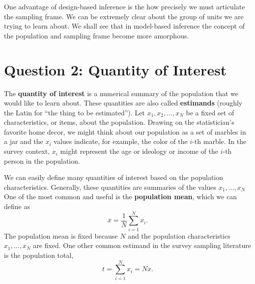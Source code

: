 \documentclass[
  letterpaper,
  DIV=11,
  numbers=noendperiod]{scrreprt}
\theoremstyle{definition}
\theoremstyle{definition}
\theoremstyle{plain}
\theoremstyle{remark}
\begin{document}
One advantage of design-based inference is the how precisely we must
articulate the sampling frame. We can be extremely clear about the group
of units we are trying to learn about. We shall see that in model-based
inference the concept of the population and sampling frame become more
amorphous.

\hypertarget{question-2-quantity-of-interest}{%
\section{Question 2: Quantity of
Interest}\label{question-2-quantity-of-interest}}

The \textbf{quantity of interest} is a numerical summary of the
population that we would like to learn about. These quantities are also
called \textbf{estimands} (roughly the Latin for ``the thing to be
estimated''). Let \(x_1, x_2, \ldots, x_N\) be a fixed set of
characteristics, or items, about the population. Drawing on the
statistician's favorite home decor, we might think about our population
as a set of marbles in a jar and the \(x_i\) values indicate, for
example, the color of the \(i\)-th marble. In the survey context,
\(x_i\) might represent the age or ideology or income of the \(i\)-th
person in the population.

We can easily define many quantities of interest based on the population
characteristics. Generally, these quantities are summaries of the values
\(x_1, \ldots, x_N\) One of the most common and useful is the
\textbf{population mean}, which we can define as \[
\overline{x} = \frac{1}{N} \sum_{i=1}^N x_i.
\] The population mean is fixed because \(N\) and the population
characteristics \(x_1, \ldots, x_N\) are fixed. One other common
estimand in the survey sampling literature is the population total, \[
t = \sum_{i=1}^N x_i = N\overline{x}.
\]
\end{document}
